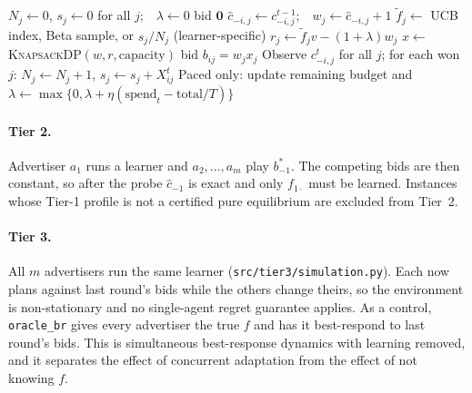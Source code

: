 \documentclass{article}
\theoremstyle{definition}
\begin{document}
\begin{algorithm}[t]
\caption{Budget-aware semi-bandit bidding for advertiser $a_i$ (Tiers 2 and 3)}\label{alg:learner}
\small
\begin{algorithmic}[1]
\State $N_j\gets0$, $s_j\gets0$ for all $j$;\ \ $\lambda\gets0$
   bid $\mathbf 0$ 
  \Else
    \State $\hat c_{-i,j}\gets c^{t-1}_{-i,j}$;\ \ $w_j\gets\hat c_{-i,j}+1$
    \State $\tilde f_j\gets$ UCB index, Beta sample, or $s_j/N_j$ (learner-specific)
    \State $r_j\gets\tilde f_jv-(1+\lambda)w_j$ 
    \State $x\gets$ \textsc{KnapsackDP}$(w,r,\text{capacity})$ 
    \State bid $b_{ij}=w_jx_j$
  \EndIf
  \State Observe $c^t_{-i,j}$ for all $j$; for each won $j$: $N_j\gets N_j+1$, $s_j\gets s_j+X^t_{ij}$
  \State Paced only: update remaining budget and $\lambda\gets\max\{0,\lambda+\eta(\text{spend}_t-\text{total}/T)\}$
\EndFor
\end{algorithmic}
\end{algorithm}

\paragraph{Tier 2.} Advertiser $a_1$ runs a learner and $a_2,\dots,a_m$ play $b^\ast_{-1}$. The competing
bids are then constant, so after the probe $\hat c_{-1}$ is exact and only $f_{1\cdot}$ must be learned.
Instances whose Tier-1 profile is not a certified pure equilibrium are excluded from Tier~2.

\paragraph{Tier 3.} All $m$ advertisers run the same learner (\texttt{src/tier3/simulation.py}). Each now
plans against last round's bids while the others change theirs, so the environment is non-stationary and
no single-agent regret guarantee applies. As a control, \texttt{oracle\_br} gives every advertiser the
true $f$ and has it best-respond to last round's bids. This is simultaneous best-response dynamics with
learning removed, and it separates the effect of concurrent adaptation from the effect of not knowing $f$.
\end{document}
